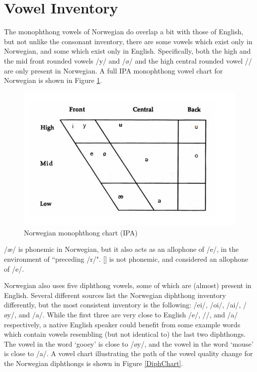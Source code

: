 \documentclass{article}
\begin{document}
\section{Vowel Inventory}

The monophthong vowels of Norwegian do overlap a bit with those of English, but not unlike the consonant inventory, there are some vowels which exist only in Norwegian, and some which exist only in English. Specifically, both the high and the mid front rounded vowels /y/ and /ø/ and the high central rounded vowel /\textbaru/ are only present in Norwegian. A full IPA monophthong vowel chart for Norwegian is shown in Figure \ref{VowelChart}. \cite{TheGermanicLanguages}
\begin{figure}[h]
    \centering
    \includegraphics[scale=.6]{images/vowels.PNG}
    \caption{Norwegian monophthong chart (IPA)}
    \label{VowelChart}
\end{figure}

/æ/ is phonemic in Norwegian, but it also acts as an allophone of /e/, in the environment of ``preceding /r/". [\textschwa] is not phonemic, and considered an allophone of /e/. \cite{TheGermanicLanguages}

Norwegian also uses five diphthong vowels, some of which are (almost) present in English. Several different sources list the Norwegian diphthong inventory differently, but the most consistent inventory is the following: /ei/, /oi/, /ai/, /øy/, and /a\textbaru/. \cite{TheGermanicLanguages} While the first three are very close to English /e\textsci/, /\textopeno\textsci/, and /a\textsci/ respectively, a native English speaker could benefit from some example words which contain vowels resembling (but not identical to) the last two diphthongs. The vowel in the word `gooey' is close to /øy/, and the vowel in the word `mouse' is close to /a\textbaru/. \newline \newline
A vowel chart illustrating the path of the vowel quality change for the Norwegian diphthongs is shown in Figure \ref{DiphChart}.
\end{document}
